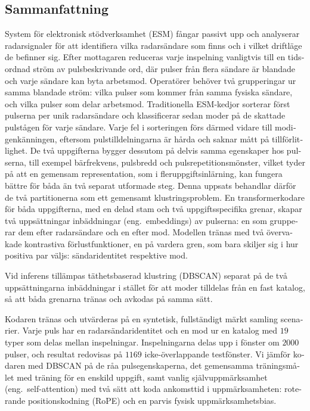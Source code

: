 \cleardoublepage%
%
\begin{otherlanguage}{swedish}
\chapter*{Sammanfattning}

System för elektronisk stödverksamhet (ESM) fångar passivt upp och analyserar radarsignaler för att identifiera vilka radarsändare som finns och i vilket driftläge de befinner sig.
Efter mottagaren reduceras varje inspelning vanligtvis till en tidsordnad ström av pulsbeskrivande ord, där pulser från flera sändare är blandade och varje sändare kan byta arbetsmod.
Operatörer behöver två grupperingar ur samma blandade ström: vilka pulser som kommer från samma fysiska sändare, och vilka pulser som delar arbetsmod.
Traditionella ESM-kedjor sorterar först pulserna per unik radarsändare och klassificerar sedan moder på de skattade pulstågen för varje sändare.
Varje fel i sorteringen förs därmed vidare till modigenkänningen, eftersom pulstilldelningarna är hårda och saknar mått på tillförlitlighet.
De två uppgifterna bygger dessutom på delvis samma egenskaper hos pulserna, till exempel bärfrekvens, pulsbredd och pulsrepetitionsmönster, vilket tyder på att en gemensam representation, som i fleruppgiftsinlärning, kan fungera bättre för båda än två separat utformade steg.
Denna uppsats behandlar därför de två partitionerna som ett gemensamt klustringsproblem.
En transformerkodare för båda uppgifterna, med en delad stam och två uppgiftsspecifika grenar, skapar två uppsättningar inbäddningar (eng.\ embeddings) av pulserna: en som grupperar dem efter radarsändare och en efter mod.
Modellen tränas med två övervakade kontrastiva förlustfunktioner, en på vardera gren, som bara skiljer sig i hur positiva par väljs: sändaridentitet respektive mod.

Vid inferens tillämpas täthetsbaserad klustring (DBSCAN) separat på de två uppsättningarna inbäddningar i stället för att moder tilldelas från en fast katalog, så att båda grenarna tränas och avkodas på samma sätt.

Kodaren tränas och utvärderas på en syntetisk, fullständigt märkt samling scenarier.
Varje puls har en radarsändaridentitet och en mod ur en katalog med $19$ typer som delas mellan inspelningar.
Inspelningarna delas upp i fönster om $2000$ pulser, och resultat redovisas på $1169$ icke-överlappande testfönster.
Vi jämför kodaren med DBSCAN på de råa pulsegenskaperna, det gemensamma träningsmålet med träning för en enskild uppgift, samt vanlig självuppmärksamhet (eng.\ self-attention) med två sätt att koda ankomsttid i uppmärksamheten: roterande positionskodning (RoPE) och en parvis fysisk uppmärksamhetsbias.


\end{otherlanguage}
